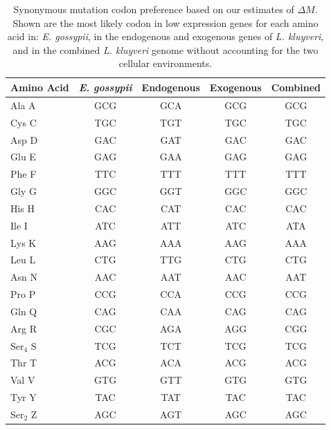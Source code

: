 \documentclass[doublespacing,linenumbers]{bmcart-modified}
\newcommand{\kluyveri}{\textit{L. kluyveri}\xspace}
\newcommand{\gossypii}{\textit{E. gossypii}\xspace}
\newcommand{\DM}{\ensuremath{{\Delta M}}\xspace}
\begin{document}
\begin{backmatter}
\begin{table}[h]
    \centering
    \caption{Synonymous mutation codon preference based on our estimates of $\DM$.
	 Shown are the most likely codon in low expression genes for each amino acid in: \gossypii, in the endogenous and exogenous genes of \kluyveri, and in the combined \kluyveri genome without accounting for the two cellular environments.}
\begin{tabular}{  l  c  c  c  c  }
\hline
	Amino Acid & \gossypii & Endogenous & Exogenous & Combined \\ \hline
	Ala A & GCG & GCA & GCG & GCG \\ 
	Cys C & TGC & TGT & TGC & TGC \\ 
	Asp D & GAC & GAT & GAC & GAC \\ 
	Glu E & GAG & GAA & GAG & GAG \\ 
	Phe F & TTC & TTT & TTT & TTT \\ 
	Gly G & GGC & GGT & GGC & GGC \\ 
	His H & CAC & CAT & CAC & CAC \\ 
	Ile I & ATC & ATT & ATC & ATA \\ 
	Lys K & AAG & AAA & AAG & AAA \\ 
	Leu L & CTG & TTG & CTG & CTG \\ 
	Asn N & AAC & AAT & AAC & AAT \\ 
	Pro P & CCG & CCA & CCG & CCG \\ 
	Gln Q & CAG & CAA & CAG & CAG \\ 
	Arg R & CGC & AGA & AGG & CGG \\ 
	Ser$_4$ S & TCG & TCT & TCG & TCG \\
	Thr T & ACG & ACA & ACG & ACG \\ 
	Val V & GTG & GTT & GTG & GTG \\ 
	Tyr Y & TAC & TAT & TAC & TAC \\ 
	Ser$_2$ Z & AGC & AGT & AGC & AGC \\ \hline
\end{tabular}
    \label{tab:codon_pref_dm}
\end{table}



\end{backmatter}
\end{document}

